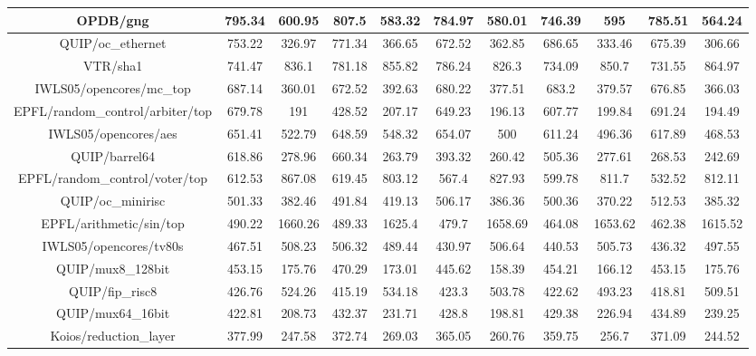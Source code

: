 {\begin{longtable}{|*{11}{c|}}
        \hline
        OPDB/gng & 795.34 & 600.95 & 807.5 & 583.32 & 784.97 & 580.01 & 746.39 & 595 & 785.51 & 564.24 \\
        \hline
        QUIP/oc\_ethernet & 753.22 & 326.97 & 771.34 & 366.65 & 672.52 & 362.85 & 686.65 & 333.46 & 675.39 & 306.66 \\
        \hline
        VTR/sha1 & 741.47 & 836.1 & 781.18 & 855.82 & 786.24 & 826.3 & 734.09 & 850.7 & 731.55 & 864.97 \\
        \hline
        IWLS05/opencores/mc\_top & 687.14 & 360.01 & 672.52 & 392.63 & 680.22 & 377.51 & 683.2 & 379.57 & 676.85 & 366.03 \\
        \hline
        EPFL/random\_control/arbiter/top & 679.78 & 191 & 428.52 & 207.17 & 649.23 & 196.13 & 607.77 & 199.84 & 691.24 & 194.49 \\
        \hline
        IWLS05/opencores/aes & 651.41 & 522.79 & 648.59 & 548.32 & 654.07 & 500 & 611.24 & 496.36 & 617.89 & 468.53 \\
        \hline
        QUIP/barrel64 & 618.86 & 278.96 & 660.34 & 263.79 & 393.32 & 260.42 & 505.36 & 277.61 & 268.53 & 242.69 \\
        \hline
        EPFL/random\_control/voter/top & 612.53 & 867.08 & 619.45 & 803.12 & 567.4 & 827.93 & 599.78 & 811.7 & 532.52 & 812.11 \\
        \hline
        QUIP/oc\_minirisc & 501.33 & 382.46 & 491.84 & 419.13 & 506.17 & 386.36 & 500.36 & 370.22 & 512.53 & 385.32 \\
        \hline
        EPFL/arithmetic/sin/top & 490.22 & 1660.26 & 489.33 & 1625.4 & 479.7 & 1658.69 & 464.08 & 1653.62 & 462.38 & 1615.52 \\
        \hline
        IWLS05/opencores/tv80s & 467.51 & 508.23 & 506.32 & 489.44 & 430.97 & 506.64 & 440.53 & 505.73 & 436.32 & 497.55 \\
        \hline
        QUIP/mux8\_128bit & 453.15 & 175.76 & 470.29 & 173.01 & 445.62 & 158.39 & 454.21 & 166.12 & 453.15 & 175.76 \\
        \hline
        QUIP/fip\_risc8 & 426.76 & 524.26 & 415.19 & 534.18 & 423.3 & 503.78 & 422.62 & 493.23 & 418.81 & 509.51 \\
        \hline
        QUIP/mux64\_16bit & 422.81 & 208.73 & 432.37 & 231.71 & 428.8 & 198.81 & 429.38 & 226.94 & 434.89 & 239.25 \\
        \hline
        Koios/reduction\_layer & 377.99 & 247.58 & 372.74 & 269.03 & 365.05 & 260.76 & 359.75 & 256.7 & 371.09 & 244.52 \\

\end{longtable}}
